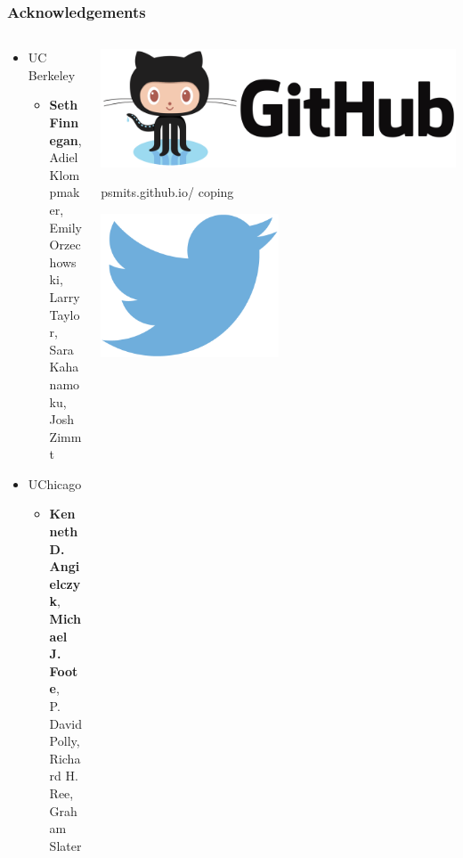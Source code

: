 \documentclass[aspectratio=169]{beamer}
\begin{document}
\begin{frame}
  \frametitle{Acknowledgements}
  \begin{columns}
    \begin{column}{0.5\textwidth}
      \begin{itemize}
        \item UC Berkeley
          \begin{itemize}
            \item \textbf{Seth Finnegan}, \\Adiel Klompmaker, \\Emily Orzechowski, \\Larry Taylor, \\Sara Kahanamoku, \\Josh Zimmt
          \end{itemize}
        \item UChicago
          \begin{itemize}
            \item \textbf{Kenneth D. Angielczyk}, \\\textbf{Michael J. Foote}, \\P. David Polly, \\Richard H. Ree, \\Graham Slater
          \end{itemize}
      \end{itemize}
    \end{column}
    \begin{column}{0.5\textwidth}
      \begin{center}
        \includegraphics[height=0.2\textheight,width=\textwidth,keepaspectratio=true]{figure/github-logo}

        psmits.github.io/ \hspace*{0.05\textwidth} coping
      \end{center}
      \vspace*{0.02\textheight}
      \begin{center}
        \includegraphics[height=0.125\textheight,width=0.5\textwidth,keepaspectratio=true]{figure/twitter} 


\end{center}
\end{column}
\end{columns}
\end{frame}
\end{document}
